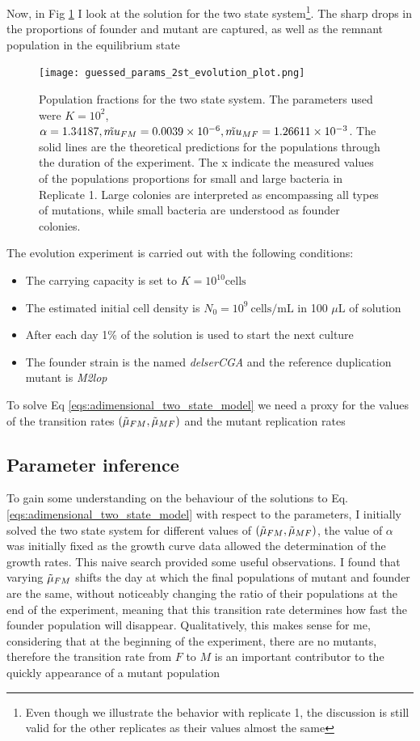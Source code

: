 \documentclass{article}
\begin{document}
Now, in Fig \ref{fig:population_frac_2st} I look at the solution for the two state system\footnote{Even though we illustrate the behavior with replicate 1, the discussion is still valid for the other replicates as their values almost the same}. The sharp drops in the proportions of founder and mutant are captured, as well as the remnant population in the equilibrium state
\begin{figure}[H]
    \centering
    \texttt{[image: guessed\_params\_2st\_evolution\_plot.png]}
    \caption{Population fractions for the two state system. The parameters used were $K = 10^2$, $\alpha = 1.34187, \Tilde{mu}_{FM} = 0.0039\times 10^{-6}, \Tilde{mu}_{MF} = 1.26611\times 10^{-3}$. The solid lines are the theoretical predictions for the populations through the duration of the experiment. The x indicate the measured values of the populations proportions for small and large bacteria in Replicate 1. Large colonies are interpreted as encompassing all types of mutations, while small bacteria are understood as founder colonies.}
    \label{fig:population_frac_2st}
\end{figure}
The evolution experiment is carried out with the following conditions: 
\begin{itemize}
    \item The carrying capacity is set to $K = 10^{10} \text{cells}$
    \item The estimated initial cell density is $N_0= 10^9 \ \text{cells/mL}$ in 100 $\mu \text{L}$ of solution
    \item After each day 1\% of the solution is used to start the next culture
    \item The founder strain is the named \textit{delserCGA} and the reference duplication mutant is \textit{M2lop}
\end{itemize}

To solve Eq \ref{eqs:adimensional_two_state_model} we need a proxy for the values of the transition rates $(\Tilde{\mu}_{FM}, \Tilde{\mu}_{MF})$ and the mutant replication rates

\subsection{Parameter inference}

To gain some understanding on the behaviour of the solutions to Eq. \ref{eqs:adimensional_two_state_model} with respect to the parameters, I initially solved the two state system for different values of $(\Tilde{\mu}_{FM}, \Tilde{\mu}_{MF})$, the value of $\alpha$ was initially fixed as the growth curve data allowed the determination of the growth rates. This naive search provided some useful observations.
I found that varying $\Tilde{\mu}_{FM}$ shifts the day at which the final populations of mutant and founder are the same, without noticeably changing the ratio of their populations at the end of the experiment, meaning that this transition rate determines how fast the founder population will disappear. Qualitatively, this makes sense for me, considering that at the beginning of the experiment, there are no mutants, therefore the transition rate from $F$ to $M$ is an important contributor to the quickly appearance of a mutant population
\end{document}
